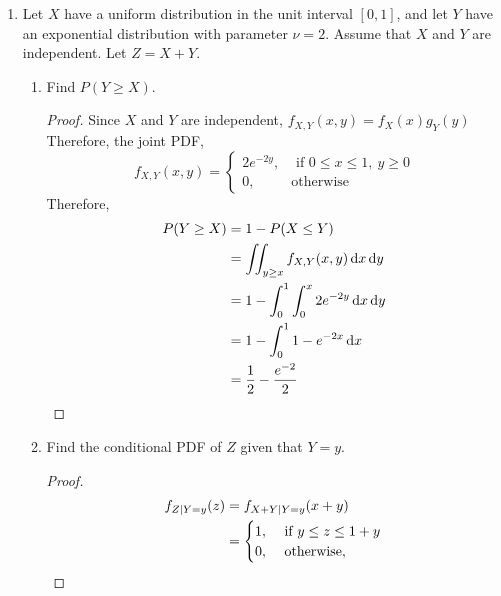 \documentclass[paper=usletter, fontsize=12pt]{article}
\begin{document}

    \begin{enumerate}

        \item Let $X$ have a uniform distribution in the unit interval $[0,1]$,
        and let $Y$ have an exponential distribution with parameter $\nu=2$.
        Assume that $X$ and $Y$ are independent. Let $Z=X+Y$.
        \begin{enumerate}

            \item Find $P(Y \ge X)$.
            \begin{proof}

                Since $X$ and $Y$ are independent,
                $f_{X,Y}(x,y)=f_X(x)g_Y(y)$\\
                Therefore, the joint PDF,
                \begin{equation*}
                    f_{X,Y}(x,y)=
                    \begin{cases}
                        2e^{-2y}, & \text{ if } 0 \le x \le 1, \ y \ge 0\\
                        0, & \text{otherwise}
                    \end{cases}
                \end{equation*}
                Therefore,
                \begin{align*}
                    P(Y \ge X) & = 1 - P(X \le Y) \\
                    & = \iint_{y \ge x}f_{X,Y}(x,y)\mathop{}\!\mathrm{d}{x}\mathop{}\!\mathrm{d}{y}\\
                    & = 1-\int_{0}^{1}\int_{0}^{x}2e^{-2y}\mathop{}\!\mathrm{d}{x}\mathop{}\!\mathrm{d}{y}\\
                    & = 1-\int_{0}^{1}1-e^{-2x}\mathop{}\!\mathrm{d}{x}\\
                    & = \frac{1}{2}-\frac{e^{-2}}{2} \qedhere
                \end{align*}
                \endgroup

            \end{proof}

            \item Find the conditional PDF of $Z$ given that $Y=y$.
            \begin{proof}

                \begin{align*}
                    f_{Z \mid Y=y}(z) & = f_{X+Y \mid Y=y}(x+y)\\
                    & = \begin{cases}
                        1, & \text{ if } y \le z \le 1+y\\
                        0, & \text{ otherwise},
                    \end{cases} \qedhere
                \end{align*}


\end{proof}
\end{enumerate}
\end{enumerate}
\end{document}
